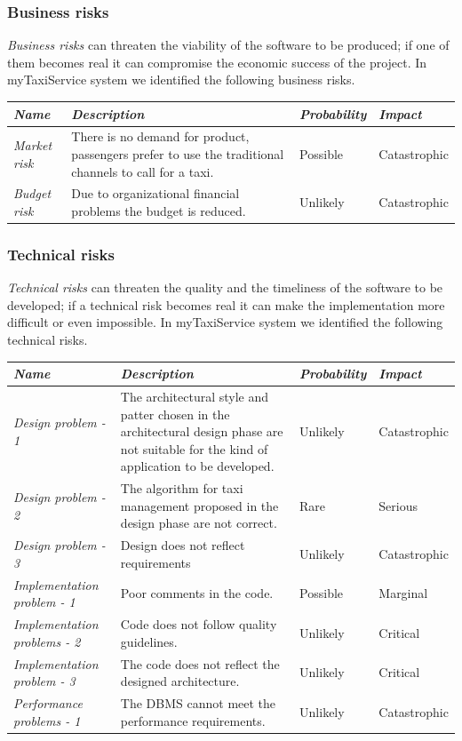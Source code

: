 \subsubsection{Business risks}

\emph{Business risks} can threaten the viability of the software to
be produced; if one of them becomes real it can compromise the economic
success of the project. In myTaxiService system we identified the
following business risks.

\medskip{}


\begin{tabular}{>{\raggedright}p{4cm}|>{\raggedright}p{5cm}|>{\centering}p{2cm}|>{\centering}p{2cm}}
\hline 
\emph{Name} & \emph{Description} & \emph{Probability} & \emph{Impact}\tabularnewline
\hline 
\hline 
\emph{Market risk} & There is no demand for product, passengers prefer to use the traditional
channels to call for a taxi. & Possible & Catastrophic\tabularnewline
\hline 
\emph{Budget risk} & Due to organizational financial problems the budget is reduced. & Unlikely & Catastrophic\tabularnewline
\hline 
\end{tabular}


\subsubsection{Technical risks}

\emph{Technical risks} can threaten the quality and the timeliness
of the software to be developed; if a technical risk becomes real
it can make the implementation more difficult or even impossible.
In myTaxiService system we identified the following technical risks.

\medskip{}


\begin{tabular}{>{\raggedright}p{4cm}|>{\raggedright}p{5cm}|>{\centering}p{2cm}|>{\centering}p{2cm}}
\hline 
\emph{Name} & \emph{Description} & \emph{Probability} & \emph{Impact}\tabularnewline
\hline 
\hline 
\emph{Design problem - 1} & The architectural style and patter chosen in the architectural design
phase are not suitable for the kind of application to be developed. & Unlikely & Catastrophic\tabularnewline
\hline 
\emph{Design problem - 2} & The algorithm for taxi management proposed in the design phase are
not correct.  & Rare & Serious\tabularnewline
\hline 
\emph{Design problem - 3} & Design does not reflect requirements & Unlikely & Catastrophic\tabularnewline
\hline 
\emph{Implementation problem - 1} & Poor comments in the code. & Possible & Marginal\tabularnewline
\hline 
\emph{Implementation problems - 2} & Code does not follow quality guidelines. & Unlikely & Critical\tabularnewline
\hline 
\emph{Implementation problem - 3} & The code does not reflect the designed architecture. & Unlikely & Critical\tabularnewline
\hline 
\emph{Performance problems - 1} & The DBMS cannot meet the performance requirements.  & Unlikely & Catastrophic\tabularnewline
\hline 
\end{tabular}


